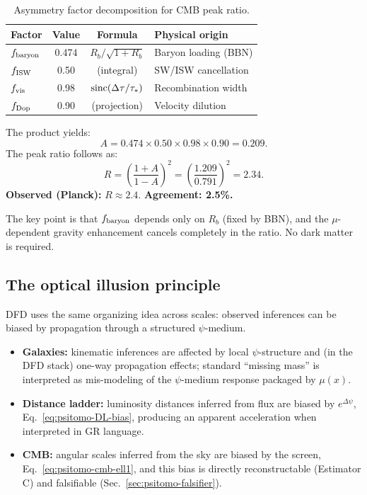 \begin{table}[h!]
\centering
\caption{Asymmetry factor decomposition for CMB peak ratio.}\label{tab:asymmetry-factors}
\begin{tabular}{lccl}
\toprule
Factor & Value & Formula & Physical origin \\
\midrule
$f_{\rm baryon}$ & 0.474 & $R_b/\sqrt{1+R_b}$ & Baryon loading (BBN) \\
$f_{\rm ISW}$ & 0.50 & (integral) & SW/ISW cancellation \\
$f_{\rm vis}$ & 0.98 & ${\rm sinc}(\Delta\tau/\tau_*)$ & Recombination width \\
$f_{\rm Dop}$ & 0.90 & (projection) & Velocity dilution \\
\bottomrule
\end{tabular}
\end{table}

The product yields:
\begin{equation}
A = 0.474 \times 0.50 \times 0.98 \times 0.90 = 0.209.
\end{equation}
The peak ratio follows as:
\begin{equation}
R = \left(\frac{1+A}{1-A}\right)^2 = \left(\frac{1.209}{0.791}\right)^2 = 2.34.
\end{equation}
\textbf{Observed (Planck):} $R \approx 2.4$. \textbf{Agreement: 2.5\%.}

The key point is that $f_{\rm baryon}$ depends only on $R_b$ (fixed by BBN), and the $\mu$-dependent gravity enhancement cancels completely in the ratio. No dark matter is required.

\subsection{The optical illusion principle}\label{sec:optical-illusion}

DFD uses the same organizing idea across scales: observed inferences can be biased by propagation through a structured $\psi$-medium.

\begin{itemize}
\item \textbf{Galaxies:} kinematic inferences are affected by local $\psi$-structure and (in the DFD stack) one-way propagation effects; standard ``missing mass'' is interpreted as mis-modeling of the $\psi$-medium response packaged by $\mu(x)$.
\item \textbf{Distance ladder:} luminosity distances inferred from flux are biased by $e^{\Delta\psi}$, Eq.~\eqref{eq:psitomo-DL-bias}, producing an apparent acceleration when interpreted in GR language.
\item \textbf{CMB:} angular scales inferred from the sky are biased by the screen, Eq.~\eqref{eq:psitomo-cmb-ell1}, and this bias is directly reconstructable (Estimator C) and falsifiable (Sec.~\ref{sec:psitomo-falsifier}).
\end{itemize}

